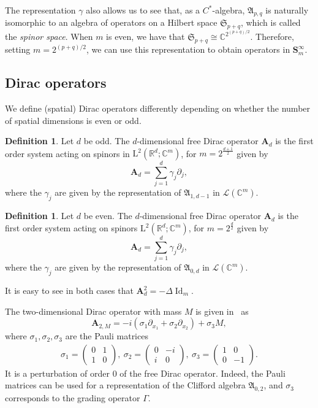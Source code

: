 \documentclass[10pt]{amsart}
\theoremstyle{definition}\newtheorem{defi}[theo]{Definition}\newtheorem{rema}[theo]{Remark}\newtheorem{exam}[theo]{Example}\newtheorem{nota}[theo]{Notation}
\DeclareMathOperator{\Id}{Id}
\newcommand{\RL}{\mathrm{L}}
\newcommand{\R}{\mathbb R}
\newcommand{\C}{\mathbb C}
\newcommand{\CL}{\mathcal{L}}
\newcommand{\BA}{\mathbf A}
\newcommand{\BS}{\mathbf S}
\newcommand{\FA}{\mathfrak A}
\newcommand{\FS}{\mathfrak S}
\newcommand{\del}{\partial}
\begin{document}
The representation $\gamma$ also allows us to see that, as a $C^*$-algebra, $\FA_{p,q}$ is naturally isomorphic to an algebra of operators on a Hilbert space $\FS_{p+q}$, which is called the \emph{spinor space}. When $m$ is even, we have that $\FS_{p+q} \cong \C^{2^{(p+q)/2}}$. Therefore, setting $m = 2^{(p+q)/2}$, we can use this representation to obtain operators in $\BS^\infty_m$.


\subsection{Dirac operators}

We define (spatial) Dirac operators differently depending on whether the number of spatial dimensions is even or odd.
\begin{defi}
Let $d$ be odd. The $d$-dimensional free Dirac operator $\BA_d$ is the first order system acting on spinors in $\RL^2(\R^d;\C^m)$, for $m = 2^{\frac{d+1}{2}}$ given by
\begin{equation}
\BA_d = \sum_{j=1}^d \gamma_j \del_j,
\end{equation}
where the $\gamma_j$ are given by the representation of $\FA_{1,d-1}$ in $\CL(\C^{m})$.
\end{defi}
\begin{defi}
Let $d$ be even. The $d$-dimensional free Dirac operator $\BA_d$ is the first order system acting on spinors $\RL^2(\R^d;\C^m)$, for $m = 2^{\frac d 2}$ given by
\begin{equation}
\BA_d = \sum_{j=1}^d \gamma_j \del_j,
\end{equation}
where the $\gamma_j$ are given by the representation of $\FA_{0,d}$ in $\CL(\C^{m})$.
\end{defi}

It is easy to see in both cases that $\BA_d^2 = - \Delta \Id_{m}$.
\begin{exem}
The two-dimensional Dirac operator with mass $M$ is given in~\cite[Equation 1.14]{thaller} as
\begin{equation}
\BA_{2,M} = -i\left(\sigma_1 \del_{x_1} + \sigma_2 \del_{x_2} \right) + \sigma_3 M,
\end{equation}
where $\sigma_1, \sigma_2,
\sigma_3$ are the Pauli matrices
\begin{align}
\sigma_1=
\begin{pmatrix}
0 & 1\\
1 & 0
\end{pmatrix},\
\sigma_2=
\begin{pmatrix}
0 & -i\\
i & 0
\end{pmatrix},\
\sigma_3=
\begin{pmatrix}
1 & 0\\
0 & -1
\end{pmatrix}.
\end{align}
It is a perturbation of order $0$ of the free Dirac operator. Indeed, the Pauli matrices can be used for a representation of the Clifford algebra $\FA_{0,2}$, and $\sigma_3$ corresponds to the grading operator $\Gamma$.
\end{exem}
\end{document}
